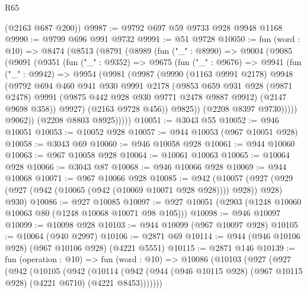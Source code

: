 \begin{lexlean}{R65}
\begin{coremodule}
      (@2163 @687 @200))
@9987 := @9792 @697 @59 @9733 @928 @9948 @1168
@9990 := @9799 @696 @991 @9732
@9991 := @51 @9728
@10050 := fun (word : @10) =>
  @8474
    (@8513
      (@8791
        (@8989
          (fun ("_" : @8990) =>
          @9004
            (@9085
              (@9091
                (@9351
                  (fun ("_" : @9352) =>
                  @9675
                    (fun ("_" : @9676) =>
                    @9941
                      (fun ("_" : @9942) =>
                      @9954
                        (@9981
                          (@9987
                            (@9990
                              (@1163 @9991 @2178)
                              @9948
                              (@9792
                                @694
                                @460
                                @941
                                @930
                                @9991
                                @2178
                                (@9853
                                  @659
                                  @931
                                  @928
                                  (@9871 @2478)
                                  @9991
                                  (@9875 @442 @928 @930 @9771 @2478 @9887 @9912)
                                  (@2147 @9698 @358))
                                @9927)
                              (@2163 @9728 @456))
                            @9825))
                        (@2208 @8397 @9730)))))
                @9062))
            (@2208 @8803 @8925)))))
@10051 := @3043 @55
@10052 := @946 @10051
@10053 := @10052 @928
@10057 := @944 @10053 (@967 @10051 @928)
@10058 := @3043 @69
@10060 := @946 @10058 @928
@10061 := @944 @10060
@10063 := @967 @10058 @928
@10064 := @10061 @10063
@10065 := @10064 @928
@10066 := @3043 @87
@10068 := @946 @10066 @928
@10069 := @944 @10068
@10071 := @967 @10066 @928
@10085 := @942
    (@10057 (@927 (@929 (@927 (@942 (@10065 (@942 (@10069 @10071 @928 @928)))) @928)) @928) @930)
@10086 := @927 @10085
@10097 := @927 @10051 (@2903 (@1248 @10060 @10063 @80 (@1248 @10068 @10071 @98 @105)))
@10098 := @946 @10097
@10099 := @10098 @928
@10103 := @944 @10099 (@967 @10097 @928)
@10105 := @10064 (@940 @2997)
@10106 := @2871 @69
@10114 := @944 (@946 @10106 @928) (@967 @10106 @928) (@4221 @5551)
@10115 := @2871 @146
@10139 := fun (operation : @10) =>
  fun (word : @10) =>
  @10086
    (@10103
      (@927
        (@927
          (@942
            (@10105
              (@942
                (@10114
                  (@942
                    (@944 (@946 @10115 @928) (@967 @10115 @928) (@4221 @6710) (@4221 @8453)))))))

\end{coremodule}
\end{lexlean}
